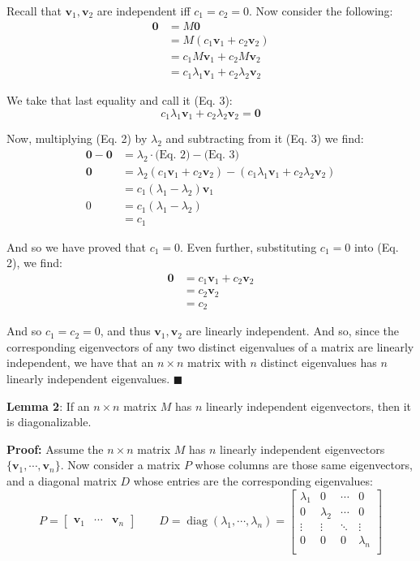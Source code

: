 \documentclass{article}
\renewcommand\vec{\mathbf}
\begin{document}
Recall that $\vec v_1,\vec v_2$ are independent iff $c_1=c_2=0$. Now consider the following:
\begin{align*}
  \vec 0&=M\vec0\\
  &=M(c_1\vec v_1+c_2\vec v_2)\tag{from Eq. 2}\\
  &=c_1M\vec v_1+c_2M\vec v_2\\
  &=c_1\lambda_1\vec v_1+c_2\lambda_2\vec v_2\tag{from Eq. 1}
\end{align*}

We take that last equality and call it (Eq. 3):
\begin{equation}
  c_1\lambda_1\vec v_1+c_2\lambda_2\vec v_2=\vec 0\tag{Eq. 3}
\end{equation}

Now, multiplying (Eq. 2) by $\lambda_2$ and subtracting from it (Eq. 3) we find:
\begin{align*}
  \vec 0-\vec 0&=\lambda_2\cdot\text{(Eq. 2)}-\text{(Eq. 3)}\\
  \vec 0&=\lambda_2(c_1\vec v_1+c_2\vec v_2)-(c_1\lambda_1\vec v_1+c_2\lambda_2\vec v_2)\\
  &=c_1(\lambda_1-\lambda_2)\vec v_1\\
  0&=c_1(\lambda_1-\lambda_2)\tag{eigenvectors are nonzero}\\
  &=c_1\tag{$\lambda_1\not=\lambda_2\implies \lambda_1-\lambda_2\not=0$}
\end{align*}

And so we have proved that $c_1=0$. Even further, substituting $c_1=0$ into (Eq. 2), we find:
\begin{align*}
  \vec 0&=c_1\vec v_1+c_2\vec v_2\tag{Eq. 2}\\
  &=c_2\vec v_2\tag{$c_1=0$}\\
  &=c_2\tag{eigenvectors are nonzero}
\end{align*}

And so $c_1=c_2=0$, and thus $\vec v_1,\vec v_2$ are linearly independent. And so, since the corresponding eigenvectors of any two distinct eigenvalues of a matrix are linearly independent, we have that an $n\times n$ matrix with $n$ distinct eigenvalues has $n$ linearly independent eigenvalues. $\blacksquare$
\bigskip

\textbf{Lemma 2}: If an $n\times n$ matrix $M$ has $n$ linearly independent eigenvectors, then it is diagonalizable.
\medskip

\textbf{Proof:} Assume the $n\times n$ matrix $M$ has $n$ linearly independent eigenvectors $\{\vec v_1,\cdots,\vec v_n\}$. Now consider a matrix $P$ whose columns are those same eigenvectors, and a diagonal matrix $D$ whose entries are the corresponding eigenvalues:
$$P=\begin{bmatrix}
  \vec v_1&\cdots&\vec v_n
\end{bmatrix}\qquad D=\operatorname{diag}(\lambda_1,\cdots,\lambda_n)=
\begin{bmatrix}
  \lambda_1&0&\cdots&0\\
  0&\lambda_2&\cdots&0\\
  \vdots&\vdots&\ddots&\vdots\\
  0&0&0&\lambda_n\\
\end{bmatrix}$$
\end{document}
